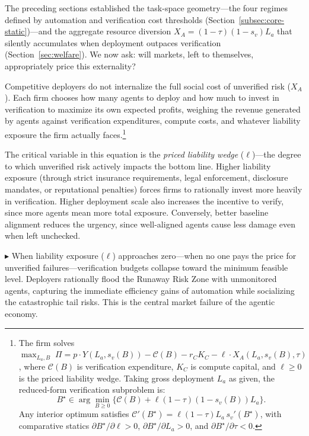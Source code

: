 \documentclass[12pt, letter]{article}
\begin{document}
The preceding sections established the task-space geometry---the four regimes defined by automation and verification cost thresholds (Section~\ref{subsec:core-static})---and the aggregate resource diversion $X_A=(1-\tau)(1-s_v)L_a$ that silently accumulates when deployment outpaces verification (Section~\ref{sec:welfare}). We now ask: will markets, left to themselves, appropriately price this externality?

Competitive deployers do not internalize the full social cost of unverified risk ($X_A$). Each firm chooses how many agents to deploy and how much to invest in verification to maximize its own expected profits, weighing the revenue generated by agents against verification expenditures, compute costs, and whatever liability exposure the firm actually faces.\footnote{The firm solves $\max_{L_a,B}\; \Pi = p\cdot Y(L_a,s_v(B)) - \mathcal{C}(B) - r_C K_C - \ell\cdot X_A(L_a,s_v(B),\tau)$, where $\mathcal{C}(B)$ is verification expenditure, $K_C$ is compute capital, and $\ell\ge 0$ is the priced liability wedge. Taking gross deployment $L_a$ as given, the reduced-form verification subproblem is:
\[
B^\star \in \arg\min_{B\ge 0}\Big\{\mathcal{C}(B) + \ell(1-\tau)(1-s_v(B))L_a\Big\}.
\]
Any interior optimum satisfies $\mathcal{C}'(B^\star) = \ell(1-\tau)L_a\, s_v'(B^\star)$, with comparative statics $\partial B^\star/\partial \ell > 0$, $\partial B^\star/\partial L_a > 0$, and $\partial B^\star/\partial \tau < 0$.}

The critical variable in this equation is the \emph{priced liability wedge} ($\ell$)---the degree to which unverified risk actively impacts the bottom line. Higher liability exposure (through strict insurance requirements, legal enforcement, disclosure mandates, or reputational penalties) forces firms to rationally invest more heavily in verification. Higher deployment scale also increases the incentive to verify, since more agents mean more total exposure. Conversely, better baseline alignment reduces the urgency, since well-aligned agents cause less damage even when left unchecked.

$\blacktriangleright$ When liability exposure ($\ell$) approaches zero---when no one pays the price for unverified failures---verification budgets collapse toward the minimum feasible level. Deployers rationally flood the Runaway Risk Zone with unmonitored agents, capturing the immediate efficiency gains of automation while socializing the catastrophic tail risks. This is the central market failure of the agentic economy.
\end{document}
